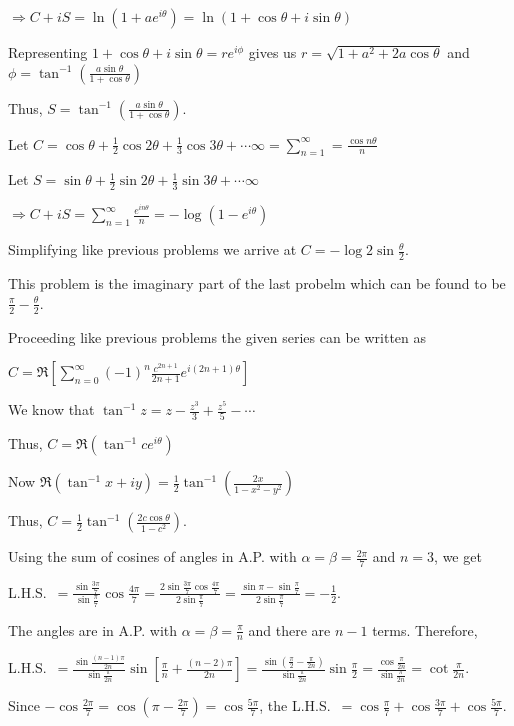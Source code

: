   $\Rightarrow C + iS = \ln\left(1 + ae^{i\theta}\right) = \ln(1 + \cos\theta + i\sin\theta)$

  Representing $1 + \cos\theta + i\sin\theta = re^{i\phi}$ gives us $r = \sqrt{1 + a^2 + 2a\cos\theta}$ and
  $\phi = \tan^{-1}\left(\frac{a\sin\theta}{1 + \cos\theta}\right)$

  Thus, $S = \tan^{-1}\left(\frac{a\sin\theta}{1 + \cos\theta}\right)$.
\item Let $C = \cos\theta + \frac{1}{2}\cos2\theta + \frac{1}{3}\cos3\theta + \cdots \infty =
  \displaystyle\sum_{n = 1}^\infty = \frac{\cos n\theta}{n}$

  Let $S = \sin\theta + \frac{1}{2}\sin2\theta + \frac{1}{3}\sin3\theta + \cdots \infty$

  $\Rightarrow C + iS = \displaystyle\sum_{n = 1}^\infty \frac{e^{in\theta}}{n} = -\log\left(1 -
  e^{i\theta}\right)$

  Simplifying like previous problems we arrive at $C = -\log2\sin\frac{\theta}{2}$.
\item This problem is the imaginary part of the last probelm which can be found to be $\frac{\pi}{2} -
  \frac{\theta}{2}$.
\item Proceeding like previous problems the given series can be written as

  $C = \Re\left[\displaystyle\sum_{n = 0}^\infty(-1)^n\frac{c^{2n + 1}}{2n + 1}e^{i(2n + 1)\theta}\right]$

  We know that $\tan^{-1}z = z - \frac{z^3}{3} + \frac{z^5}{5} - \cdots$

  Thus, $C = \Re\left(\tan^{-1}ce^{i\theta}\right)$

  Now $\Re\left(\tan^{-1}{x + iy}\right) = \frac{1}{2}\tan^{-1}\left(\frac{2x}{1 - x^2 - y^2}\right)$

  Thus, $C = \frac{1}{2}\tan^{-1}\left(\frac{2c\cos\theta}{1 - c^2}\right)$.
\item Using the sum of cosines of angles in A.P. with $\alpha = \beta = \frac{2\pi}{7}$ and $n = 3$, we get

  L.H.S.\ $= \frac{\sin\frac{3\pi}{7}}{\sin\frac{\pi}{7}}\cos\frac{4\pi}{7} =
  \frac{2\sin\frac{3\pi}{7}\cos\frac{4\pi}{7}}{2\sin\frac{\pi}{7}} = \frac{\sin\pi -
    \sin\frac{\pi}{7}}{2\sin\frac{\pi}{7}} = -\frac{1}{2}$.
\item The angles are in A.P. with $\alpha = \beta = \frac{\pi}{n}$ and there are $n - 1$ terms. Therefore,

  L.H.S.\ $= \frac{\sin\frac{(n - 1)\pi}{2n}}{\sin\frac{\pi}{2n}}\sin\left[\frac{\pi}{n} + \frac{(n -
      2)\pi}{2n}\right] = \frac{\sin\left(\frac{\pi}{2} - \frac{\pi}{2n}\right)}{\sin\frac{\pi}{2n}}\sin\frac{\pi}{2}
  = \frac{\cos\frac{\pi}{2n}}{\sin\frac{\pi}{2n}} = \cot\frac{\pi}{2n}$.
\item Since $-\cos\frac{2\pi}{7} = \cos\left(\pi - \frac{2\pi}{7}\right) = \cos\frac{5\pi}{7}$, the L.H.S.\ $=
  \cos\frac{\pi}{7} + \cos\frac{3\pi}{7} + \cos\frac{5\pi}{7}$.

